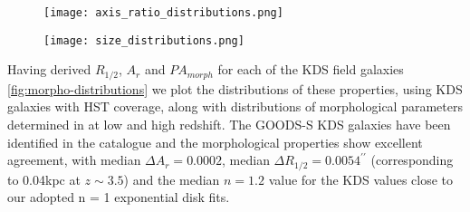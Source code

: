 \documentclass[fleqn,usenatbib]{mn2e}
\begin{document}
\begin{figure*}
    \centering \hspace{-2.0cm}
    \begin{subfigure}[h!]{0.50\textwidth}
        \centering
        \texttt{[image: axis\_ratio\_distributions.png]}
    \end{subfigure} \hspace{0.4cm}
    \begin{subfigure}[h!]{0.50\textwidth}
        \centering
        \texttt{[image: size\_distributions.png]}
    \end{subfigure}
    \caption{We crossmatch publicly available spectroscopic redshifts for SFGs, as discussed in the text, with the morphological catalogue presented in \protect\cite{VanderWel2012} in two different redshift slices.
    This provides a set of reference morphological properties for typical SFGs at different evolutionary stages to which the derived KDS values can be compared.
    We find that the KDS galaxies are much more compact than those at low redshift, as traced by $R_{1/2}$ parameter, which could partially be explained by the F160W filter tracing a younger stellar population at $z\sim3.5$.
    The distribution of KDS $R_{1/2}$ values are consistent with those in the higher redshift reference sample.
    The $A_{r}$ distribution appears to be constant with time as traced by the reference samples, and the KDS values are in good agreement with a relatively uniform distribution spanning $0.3 < A_{r} < 0.9$.
    This shows that we have not been biased towards deriving low or high $A_{r}$ values.}
    \label{fig:morpho-distributions}
\end{figure*}

Having derived $R_{1/2}$, $A_{r}$ and $PA_{morph}$ for each of the KDS field galaxies \ref{fig:morpho-distributions} we plot the distributions of these properties, using KDS galaxies with HST coverage, along with distributions of morphological parameters determined in \cite{VanderWel2012} at low and high redshift.
The GOODS-S KDS galaxies have been identified in the \cite{VanderWel2012} catalogue and the morphological properties show excellent agreement, with median $\Delta A_{r} = 0.0002$, median $\Delta R_{1/2} = 0.0054^{\prime\prime}$ (corresponding to 0.04kpc at $z\sim3.5$) and the median \cite{VanderWel2012} $n = 1.2$ value for the KDS values close to our adopted n = 1 exponential disk fits.
\end{document}
